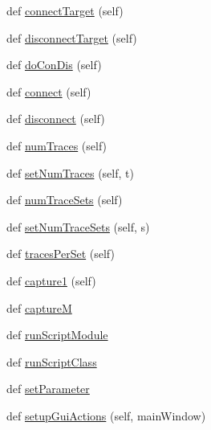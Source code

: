 \begin{DoxyCompactItemize}
def \hyperlink{classsoftware_1_1chipwhisperer_1_1common_1_1api_1_1CWCoreAPI_1_1CWCoreAPI_aeb49a364521ac11bea888c6b7c8e70f9}{connect\+Target} (self)
\item 
def \hyperlink{classsoftware_1_1chipwhisperer_1_1common_1_1api_1_1CWCoreAPI_1_1CWCoreAPI_a1d029b87455cf66e64d6c7338d05c4ca}{disconnect\+Target} (self)
\item 
def \hyperlink{classsoftware_1_1chipwhisperer_1_1common_1_1api_1_1CWCoreAPI_1_1CWCoreAPI_a59dc554fc66962082047c2cf4637db95}{do\+Con\+Dis} (self)
\item 
def \hyperlink{classsoftware_1_1chipwhisperer_1_1common_1_1api_1_1CWCoreAPI_1_1CWCoreAPI_a52553d5d69f20c5092c4118963f6809e}{connect} (self)
\item 
def \hyperlink{classsoftware_1_1chipwhisperer_1_1common_1_1api_1_1CWCoreAPI_1_1CWCoreAPI_a6cd02a0b256431d823da4d28c8c6e093}{disconnect} (self)
\item 
def \hyperlink{classsoftware_1_1chipwhisperer_1_1common_1_1api_1_1CWCoreAPI_1_1CWCoreAPI_ade8d65d8e7128786b497a12f9df497d8}{num\+Traces} (self)
\item 
def \hyperlink{classsoftware_1_1chipwhisperer_1_1common_1_1api_1_1CWCoreAPI_1_1CWCoreAPI_af3183bb22cc2f4d683670f73f4f9ee42}{set\+Num\+Traces} (self, t)
\item 
def \hyperlink{classsoftware_1_1chipwhisperer_1_1common_1_1api_1_1CWCoreAPI_1_1CWCoreAPI_a59b24c9e376d3182cce96f0e69bf35b9}{num\+Trace\+Sets} (self)
\item 
def \hyperlink{classsoftware_1_1chipwhisperer_1_1common_1_1api_1_1CWCoreAPI_1_1CWCoreAPI_aa81d3dd341a774b1329a4406eaeb89e4}{set\+Num\+Trace\+Sets} (self, s)
\item 
def \hyperlink{classsoftware_1_1chipwhisperer_1_1common_1_1api_1_1CWCoreAPI_1_1CWCoreAPI_acf30a1f42698176fe07692ae548b87f9}{traces\+Per\+Set} (self)
\item 
def \hyperlink{classsoftware_1_1chipwhisperer_1_1common_1_1api_1_1CWCoreAPI_1_1CWCoreAPI_a35653b9028ba2723c4dda539e1e46126}{capture1} (self)
\item 
def \hyperlink{classsoftware_1_1chipwhisperer_1_1common_1_1api_1_1CWCoreAPI_1_1CWCoreAPI_a7368a357dd15150809fc809d97870644}{capture\+M}
\item 
def \hyperlink{classsoftware_1_1chipwhisperer_1_1common_1_1api_1_1CWCoreAPI_1_1CWCoreAPI_a32881079b9477f464be0725ad6ff8305}{run\+Script\+Module}
\item 
def \hyperlink{classsoftware_1_1chipwhisperer_1_1common_1_1api_1_1CWCoreAPI_1_1CWCoreAPI_a2be7cf8289447e16377c425b36a3df90}{run\+Script\+Class}
\item 
def \hyperlink{classsoftware_1_1chipwhisperer_1_1common_1_1api_1_1CWCoreAPI_1_1CWCoreAPI_a65f68c72cbae859985378c9957f286b6}{set\+Parameter}
\item 
def \hyperlink{classsoftware_1_1chipwhisperer_1_1common_1_1api_1_1CWCoreAPI_1_1CWCoreAPI_aa497640f72b0442952756f90565de4de}{setup\+Gui\+Actions} (self, main\+Window)
\end{DoxyCompactItemize}
